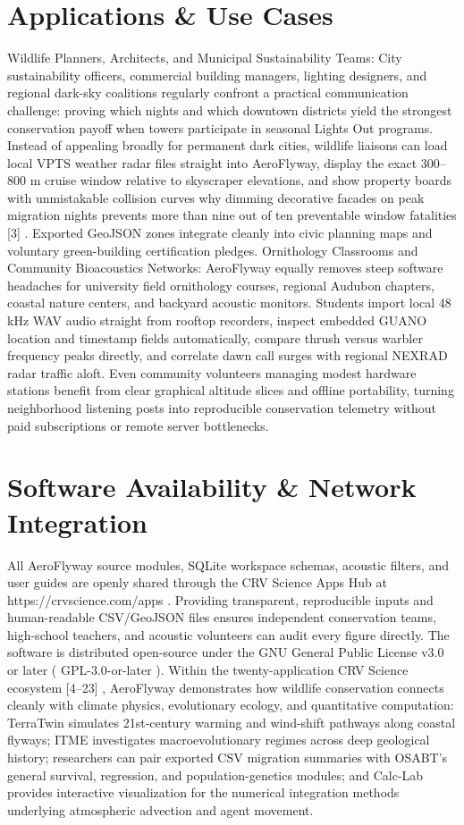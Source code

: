 \documentclass[10pt,letterpaper]{article}
\begin{document}
\section{Applications \& Use Cases}
Wildlife Planners, Architects, and Municipal Sustainability Teams: City sustainability officers, commercial building managers, lighting designers, and regional dark-sky coalitions regularly confront a practical communication challenge: proving which nights and which downtown districts yield the strongest conservation payoff when towers participate in seasonal Lights Out programs. Instead of appealing broadly for permanent dark cities, wildlife liaisons can load local VPTS weather radar files straight into AeroFlyway, display the exact 300--800 m cruise window relative to skyscraper elevations, and show property boards with unmistakable collision curves why dimming decorative facades on peak migration nights prevents more than nine out of ten preventable window fatalities [3] . Exported GeoJSON zones integrate cleanly into civic planning maps and voluntary green-building certification pledges. Ornithology Classrooms and Community Bioacoustics Networks: AeroFlyway equally removes steep software headaches for university field ornithology courses, regional Audubon chapters, coastal nature centers, and backyard acoustic monitors. Students import local 48 kHz WAV audio straight from rooftop recorders, inspect embedded GUANO location and timestamp fields automatically, compare thrush versus warbler frequency peaks directly, and correlate dawn call surges with regional NEXRAD radar traffic aloft. Even community volunteers managing modest hardware stations benefit from clear graphical altitude slices and offline portability, turning neighborhood listening posts into reproducible conservation telemetry without paid subscriptions or remote server bottlenecks.

\section{Software Availability \& Network Integration}
All AeroFlyway source modules, SQLite workspace schemas, acoustic filters, and user guides are openly shared through the CRV Science Apps Hub at https://crvscience.com/apps . Providing transparent, reproducible inputs and human-readable CSV/GeoJSON files ensures independent conservation teams, high-school teachers, and acoustic volunteers can audit every figure directly. The software is distributed open-source under the GNU General Public License v3.0 or later ( GPL-3.0-or-later ). Within the twenty-application CRV Science ecosystem [4--23] , AeroFlyway demonstrates how wildlife conservation connects cleanly with climate physics, evolutionary ecology, and quantitative computation: TerraTwin simulates 21st-century warming and wind-shift pathways along coastal flyways; ITME investigates macroevolutionary regimes across deep geological history; researchers can pair exported CSV migration summaries with OSABT's general survival, regression, and population-genetics modules; and Calc-Lab provides interactive visualization for the numerical integration methods underlying atmospheric advection and agent movement.
\end{document}
